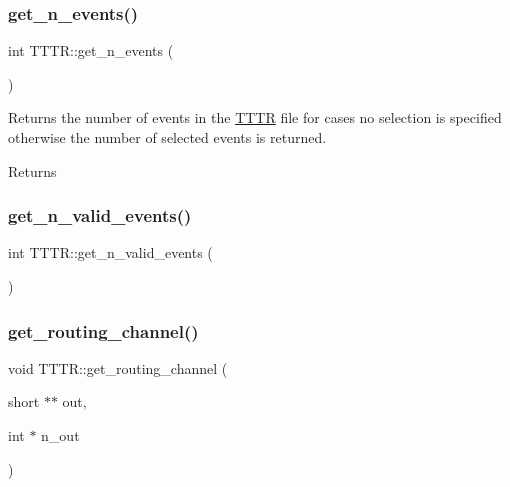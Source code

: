 \mbox{\label{class_t_t_t_r_a00b74138ed8a061e30a615dfff328960}} 
\subsubsection{\texorpdfstring{get\+\_\+n\+\_\+events()}{get\_n\_events()}}
{\footnotesize\ttfamily int T\+T\+T\+R\+::get\+\_\+n\+\_\+events (\begin{DoxyParamCaption}{ }\end{DoxyParamCaption})}

Returns the number of events in the \hyperlink{class_t_t_t_r}{T\+T\+TR} file for cases no selection is specified otherwise the number of selected events is returned. \begin{DoxyReturn}{Returns}

\end{DoxyReturn}
\mbox{\label{class_t_t_t_r_a500fa2f0fe263e7e309ed1c2be451114}} 
\subsubsection{\texorpdfstring{get\+\_\+n\+\_\+valid\+\_\+events()}{get\_n\_valid\_events()}}
{\footnotesize\ttfamily int T\+T\+T\+R\+::get\+\_\+n\+\_\+valid\+\_\+events (\begin{DoxyParamCaption}{ }\end{DoxyParamCaption})}

\mbox{\label{class_t_t_t_r_a4171e1f0e8a709aae25cedbdd66a2bfb}} 
\subsubsection{\texorpdfstring{get\+\_\+routing\+\_\+channel()}{get\_routing\_channel()}}
{\footnotesize\ttfamily void T\+T\+T\+R\+::get\+\_\+routing\+\_\+channel (\begin{DoxyParamCaption}\item[{short $\ast$$\ast$}]{out,  }\item[{int $\ast$}]{n\+\_\+out }\end{DoxyParamCaption})}

